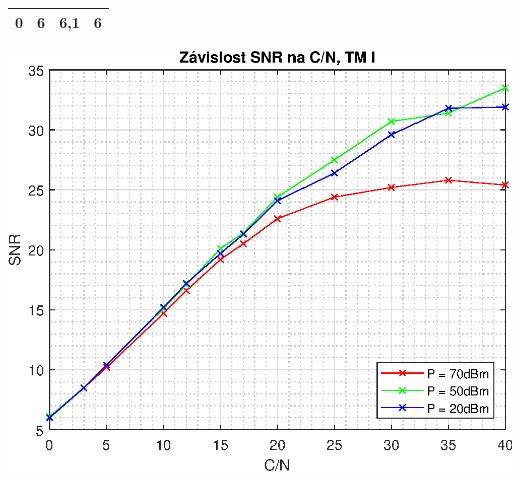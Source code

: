 \documentclass[10pt, a4paper]{article}%
\begin{document}
\begin{table}[ht!]
\begin{minipage}{0.5\textwidth}
{\begin{tabular}{|cccc|}
    \multicolumn{1}{|c|}{\textbf{0}}       & \multicolumn{1}{c|}{6}               & \multicolumn{1}{c|}{6,1}             & 6               \\ \hline
    \end{tabular}%
    }
\end{minipage}
\hfill
\begin{minipage}{0.45\textwidth}
    \centering
    \includegraphics[width=1\textwidth]{SNR_CN.eps}
\end{minipage}

\end{table}
\end{document}
